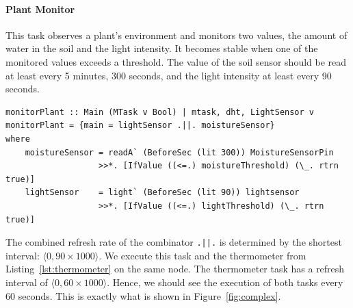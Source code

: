 \documentclass[runningheads]{llncs}
\newcommand{\CleanInline}[1]{\lstinline[language=Clean]!#1!}
\newcommand{\prog}[1]{\CleanInline{#1}}
\begin{document}


\paragraph{Plant Monitor}

This task observes a plant's environment and monitors two values, the amount of water in the soil and the light intensity.
It becomes stable when one of the monitored values exceeds a threshold.
The value of the soil sensor should be read at least every 5 minutes, 300 seconds, and the light intensity at least every 90 seconds.

\begin{lstlisting}[language=Clean,caption={The plant monitor task.},label={lst:plantMonitor}]
monitorPlant :: Main (MTask v Bool) | mtask, dht, LightSensor v
monitorPlant = {main = lightSensor .||. moistureSensor}
where
    moistureSensor = readA` (BeforeSec (lit 300)) MoistureSensorPin
                   >>*. [IfValue ((<=.) moistureThreshold) (\_. rtrn true)]
    lightSensor    = light` (BeforeSec (lit 90)) lightsensor
                   >>*. [IfValue ((<=.) lightThreshold) (\_. rtrn true)]
\end{lstlisting}
The combined refresh rate of the combinator \prog{.||.} is determined by the shortest interval: $\langle 0, 90 \times 1000 \rangle$.
We execute this task and the thermometer from Listing~\ref{lst:thermometer} on the same node.
The thermometer task has a refresh interval of $\langle 0, 60 \times 1000 \rangle$.
Hence, we should see the execution of both tasks every 60 seconds.
This is exactly what is shown in Figure~\ref{fig:complex}.
\end{document}
